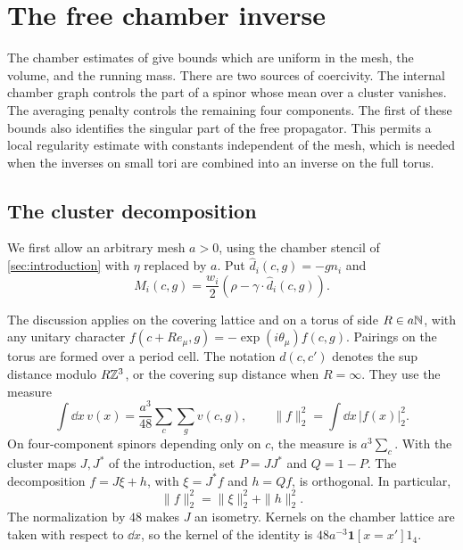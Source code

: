 \section{The free chamber inverse}\label{sec:propagators}

The chamber estimates of \cite[Section~9]{QED3Manuscript} give bounds which
are uniform in the mesh, the volume, and the running mass. There are two
sources of coercivity. The internal chamber graph controls the part of a
spinor whose mean over a cluster vanishes. The averaging penalty controls
the remaining four components. The first of these bounds also identifies
the singular part of the free propagator. This permits a local regularity
estimate with constants independent of the mesh, which is needed when
the inverses on small tori are combined into an inverse on the full torus.

\subsection{The cluster decomposition}\label{subsec:cluster-decomposition}

We first allow an arbitrary mesh $a>0$, using the chamber stencil of
\cref{sec:introduction} with $\eta$ replaced by $a$. Put
$\widehat d_i(c,g)=-gn_i$ and
\[
 M_i(c,g)=\frac{w_i}{2}(\rho-\gamma\cdot\widehat d_i(c,g)).
\]

The discussion applies on the covering lattice and on a torus of side
$R\in a\mathbb N$, with any unitary character
$f(c+Re_\mu,g)=-\exp(i\theta_\mu)f(c,g)$. Pairings on the torus are
formed over a period cell. The notation $d(c,c')$ denotes the sup
distance modulo $R\mathbb Z^3$, or the covering sup distance when $R=\infty$.
They use the measure
\[
 \int\dd x\,v(x)=\frac{a^3}{48}\sum_c\sum_gv(c,g),
 \qquad
 \|f\|_2^2=\int\dd x\,|f(x)|_2^2.
\]
On four-component spinors depending only on $c$, the measure is
$a^3\sum_c$. With the cluster maps $J,J^*$ of the introduction,
set $P=JJ^*$ and $Q=1-P$. The decomposition $f=J\xi+h$, with
$\xi=J^*f$ and $h=Qf$, is orthogonal. In particular,
\begin{equation}\label{eq:cluster-orthogonal}
 \|f\|_2^2=\|\xi\|_2^2+\|h\|_2^2.
\end{equation}
The normalization by $48$ makes $J$ an isometry. Kernels on the chamber
lattice are taken with respect to $\dd x$, so the kernel of the identity
is $48a^{-3}\mathbf1[x=x']1_4$.

